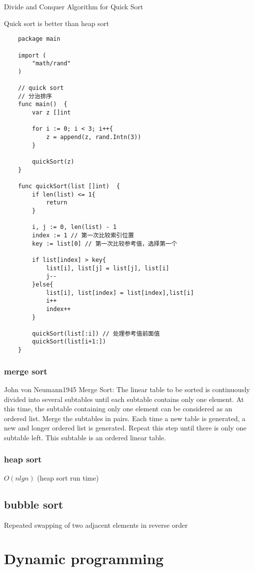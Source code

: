 \documentclass[oneside,12pt,twiside,a4paper]{ctexbook}
\begin{document}
Divide and Conquer Algorithm for Quick Sort

Quick sort is better than heap sort
\begin{lstlisting}
    package main

    import (
        "math/rand"
    )
    
    // quick sort
    // 分治排序
    func main()  {
        var z []int
    
        for i := 0; i < 3; i++{
            z = append(z, rand.Intn(3))
        }
        
        quickSort(z)	
    }
    
    func quickSort(list []int)  {
        if len(list) <= 1{
            return
        }
    
        i, j := 0, len(list) - 1
        index := 1 // 第一次比较索引位置
        key := list[0] // 第一次比较参考值，选择第一个
    
        if list[index] > key{
            list[i], list[j] = list[j], list[i]
            j--
        }else{
            list[i], list[index] = list[index],list[i]
            i++
            index++
        }
    
        quickSort(list[:i]) // 处理参考值前面值
        quickSort(list[i+1:])
    }
\end{lstlisting}
%
\subsection{merge sort}
John von Neumann1945
Merge Sort:
The linear table to be sorted is continuously divided into several subtables until each 
subtable contains only one element. 
At this time, the subtable containing only one element can be considered as an ordered list.
Merge the subtables in pairs. Each time a new table is generated, 
a new and longer ordered list is generated. 
Repeat this step until there is only one subtable left. 
This subtable is an ordered linear table.
%
\subsection{heap sort}
$O(nlgn)$ (heap sort run time)

%
\section{bubble sort}
Repeated swapping of two adjacent elements in reverse order


\chapter{Dynamic programming}
\end{document}
